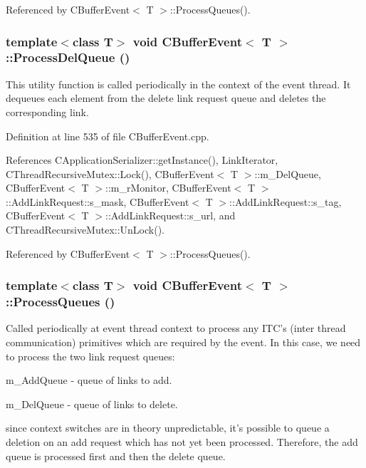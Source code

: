 Referenced by CBuffer\-Event$<$ T $>$::Process\-Queues().
\subsubsection{\setlength{\rightskip}{0pt plus 5cm}template$<$class T$>$ void CBuffer\-Event$<$ T $>$::Process\-Del\-Queue ()\hspace{0.3cm}{\tt  [protected]}}\label{classCBufferEvent_b2}


This utility function is called periodically in the context of the event thread. It dequeues each element from the delete link request queue and deletes the corresponding link. 

Definition at line 535 of file CBuffer\-Event.cpp.

References CApplication\-Serializer::get\-Instance(), Link\-Iterator, CThread\-Recursive\-Mutex::Lock(), CBuffer\-Event$<$ T $>$::m\_\-Del\-Queue, CBuffer\-Event$<$ T $>$::m\_\-r\-Monitor, CBuffer\-Event$<$ T $>$::Add\-Link\-Request::s\_\-mask, CBuffer\-Event$<$ T $>$::Add\-Link\-Request::s\_\-tag, CBuffer\-Event$<$ T $>$::Add\-Link\-Request::s\_\-url, and CThread\-Recursive\-Mutex::Un\-Lock().

Referenced by CBuffer\-Event$<$ T $>$::Process\-Queues().
\subsubsection{\setlength{\rightskip}{0pt plus 5cm}template$<$class T$>$ void CBuffer\-Event$<$ T $>$::Process\-Queues ()\hspace{0.3cm}{\tt  [protected, virtual]}}\label{classCBufferEvent_b0}


Called periodically at event thread context to process any ITC's (inter thread communication) primitives which are required by the event. In this case, we need to process the two link request queues:\begin{CompactItemize}
\item 
m\_\-Add\-Queue - queue of links to add.\item 
m\_\-Del\-Queue - queue of links to delete.\end{CompactItemize}
since context switches are in theory unpredictable, it's possible to  queue a deletion on an add request which has not yet been processed.  Therefore, the add queue is processed first and then the delete queue. 

